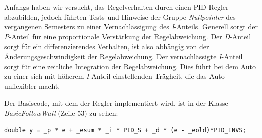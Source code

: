 Anfangs haben wir versucht, das Regelverhalten durch einen PID-Regler abzubilden, jedoch führten Tests und Hinweise der Gruppe \textit{Nullpointer} des vergangenen Semesters zu einer Vernachlässigung des \textit{I}-Anteils. Generell sorgt der \textit{P}-Anteil für eine proportionale Verstärkung der Regelabweichung. Der \textit{D}-Anteil sorgt für ein differenzierendes Verhalten, ist also abhängig von der Änderungsgeschwindigkeit der Regelabweichung.
Der vernachlässigte \textit{I}-Anteil sorgt für eine zeitliche Integration der Regelabweichung. Dies führt bei dem Auto zu einer sich mit höherem \textit{I}-Anteil einstellenden Trägheit, die das Auto unflexibler macht.

Der Basiscode, mit dem der Regler implementiert wird, ist in der Klasse \textit{BasicFollowWall} (Zeile 53) zu sehen:

\begin{lstlisting}
double y = _p * e + _esum * _i * PID_S + _d * (e - _eold)*PID_INVS;
\end{lstlisting}

